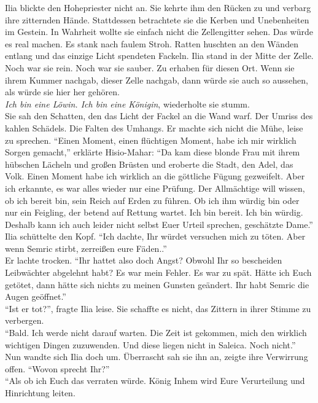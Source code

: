 Ilia blickte den Hohepriester nicht an. Sie kehrte ihm den Rücken zu und verbarg ihre zitternden 
Hände. Stattdessen betrachtete sie die Kerben und Unebenheiten im Gestein. In Wahrheit wollte sie 
einfach nicht die Zellengitter sehen. Das würde es real machen. Es stank nach faulem Stroh. Ratten 
huschten an den Wänden entlang und das einzige Licht spendeten Fackeln. Ilia stand in 
der Mitte der Zelle. Noch war sie rein. Noch war sie sauber. Zu erhaben für diesen Ort. Wenn sie 
ihrem Kummer nachgab, dieser Zelle nachgab, dann würde sie auch so aussehen, als würde sie hier her 
gehören.\\
\textit{Ich bin eine Löwin. Ich bin eine Königin}, wiederholte sie stumm.\\
Sie sah den Schatten, den das Licht der Fackel an die Wand warf. Der Umriss des kahlen Schädels. 
Die Falten des Umhangs. Er machte sich nicht die Mühe, leise zu sprechen. ``Einen Moment, einen 
flüchtigen Moment, habe ich mir wirklich Sorgen gemacht,'' erklärte Hisio-Mahar: ``Da kam diese 
blonde Frau mit ihrem hübschen Lächeln und großen Brüsten und eroberte die Stadt, den Adel, das 
Volk. Einen Moment habe ich wirklich an die göttliche Fügung gezweifelt. Aber ich erkannte, es war 
alles wieder nur eine Prüfung. Der Allmächtige will wissen, ob ich bereit bin, sein Reich auf 
Erden zu führen. Ob ich ihm würdig bin oder nur ein Feigling, der betend auf Rettung wartet. Ich 
bin bereit. Ich bin würdig. Deshalb kann ich auch leider nicht selbst Euer Urteil sprechen, 
geschätzte Dame.''\\
Ilia schüttelte den Kopf. ``Ich dachte, Ihr würdet versuchen mich zu töten. Aber wenn Semric 
stirbt, zerreißen eure Fäden..''\\
Er lachte trocken. ``Ihr hattet also doch Angst? Obwohl Ihr so bescheiden Leibwächter abgelehnt 
habt? Es war mein Fehler. Es war zu spät. Hätte ich Euch getötet, dann hätte sich nichts zu meinen 
Gunsten geändert. Ihr habt Semric die Augen geöffnet.''\\
``Ist er tot?'', fragte Ilia leise. Sie schaffte es nicht, das Zittern in ihrer Stimme zu 
verbergen.\\
``Bald. Ich werde nicht darauf warten. Die Zeit ist gekommen, mich den wirklich wichtigen Dingen 
zuzuwenden. Und diese liegen nicht in Saleica. Noch nicht.''\\
Nun wandte sich Ilia doch um. Überrascht sah sie ihn an, zeigte ihre Verwirrung offen. ``Wovon 
sprecht Ihr?''\\
``Als ob ich Euch das verraten würde. König Inhem wird Eure Verurteilung und Hinrichtung leiten. 
